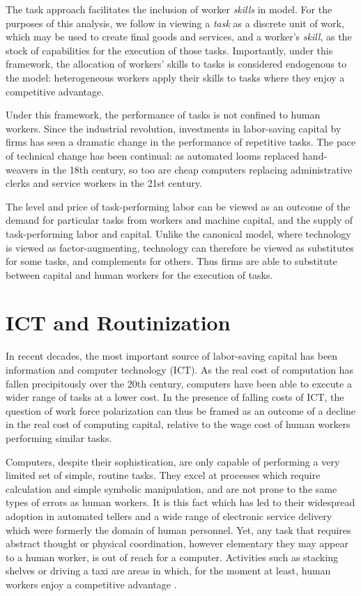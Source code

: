 The task approach facilitates the inclusion of worker \emph{skills} in model. For the purposes of this analysis, we follow \citet{Autor2013} in viewing a \emph{task} as a discrete unit of work, which may be used to create final goods and services, and a worker's \emph{skill}, as the stock of capabilities for the execution of those tasks. Importantly, under this framework, the allocation of workers' skills to tasks is considered endogenous to the model: heterogeneous workers apply their skills to tasks where they enjoy a competitive advantage.

Under this framework, the performance of tasks is not confined to human workers. Since the industrial revolution, investments in labor-saving capital by firms has seen a dramatic change in the performance of repetitive tasks. The pace of technical change has been continual: as automated looms replaced hand-weavers in the 18th century, so too are cheap computers replacing administrative clerks and service workers in the 21st century.

The level and price of task-performing labor can be 
viewed as an outcome of the demand for particular tasks from workers and machine capital, and the supply of task-performing labor and capital. Unlike the canonical model, where technology is viewed as factor-augmenting,  technology can therefore be viewed as substitutes for some tasks, and complements for others. Thus firms are able to substitute between capital and human workers for the execution of tasks.

\section{ICT and Routinization}

In recent decades, the most important source of labor-saving capital has been information and computer technology (ICT). As the real cost of computation has fallen precipitously over the 20th century, computers have been able to execute a wider range of tasks at a lower cost. In the presence of falling costs of ICT, the question of work force polarization can thus be framed as an outcome of a decline in the real cost of computing capital, relative to the wage cost of human workers performing similar tasks.

Computers, despite their sophistication, are only capable of performing a very limited set of simple, routine tasks. They excel at processes which require calculation and simple symbolic manipulation, and are not prone to the same types of errors as human workers. It is this fact which has led to their widespread adoption in automated tellers and a wide range of electronic service delivery which were formerly the domain of human personnel. Yet, any task that requires abstract thought or physical coordination, however elementary they may appear to a human worker, is out of reach for a computer. Activities such as stacking shelves or driving a taxi are areas in which, for the moment at least, human workers enjoy a competitive advantage \citet{Levy2003}. 

